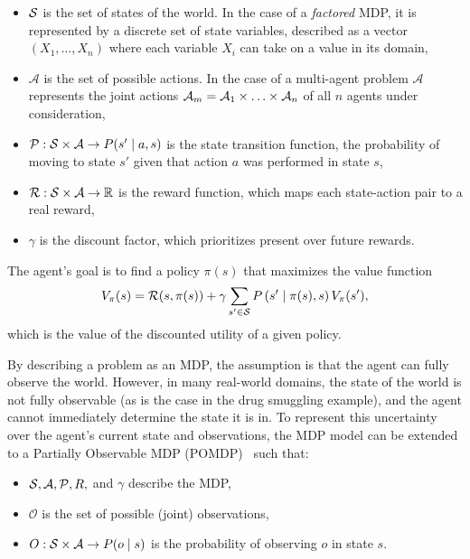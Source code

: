 \documentclass[conference]{IEEEtran}
\begin{document}
\begin{itemize}
\item $\S$ is the set of states of the world. In the case of a \emph{factored} MDP, it is represented by a discrete set of state variables, described as a vector $\left(X_1,\ldots,X_n\right)$ where each variable $X_i$ can take on a value in its domain,
\item $\mathcal{A}$ is the set of possible actions. In the case of a multi-agent problem $\mathcal{A}$ represents the joint actions $\A_{m} = \A_1\times\ldots\times\A_n$ of all $n$ agents under consideration,
\item $\P:\S\times\mathcal{A}\to P(s^\prime\mid a,s)$ is the state transition function, \ie the probability of moving to state $s'$ given that action $a$ was performed in state $s$,
\item $\R:\S\times\mathcal{A}\to\mathbb{R}$ is the reward function, which maps each state-action pair to a real reward,
\item $\gamma$ is the discount factor, which prioritizes present over future rewards.
\end{itemize}



The agent's goal is to find a policy $\pi(s)$ that maximizes the value function
\begin{equation}
V_{\pi}(s) = \R(s,\pi(s)) + \gamma\sum\limits_{s^\prime\in\S}P\left(s^\prime\mid\pi(s),s\right)V_{\pi}(s^\prime),
\end{equation} 
which is the value of the discounted utility of a given policy.

By describing a problem as an MDP, the assumption is that the agent can fully observe the world. However, in many real-world domains, the state of the world is not fully observable (as is the case in the drug smuggling example), and the agent cannot immediately determine the state it is in. To represent this uncertainty over the agent's current state and observations, the MDP model can be extended to a Partially Observable MDP (POMDP)~\cite{aastrom1965optimal,pomdp} such that: 

\begin{itemize}
\item $\S,\mathcal{A},\P,R,$ and $\gamma$ describe the MDP,
\item $\mathcal{O}$ is the set of possible (joint) observations,
\item $O:\S\times\mathcal{A}\to P(o\mid s)$ is the probability of observing $o$ in state $s$. 
\end{itemize}
\end{document}
